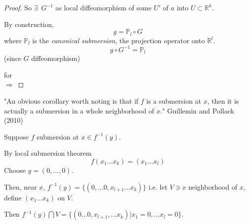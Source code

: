 \begin{proof}
So $\exists \, $ $G^{-1}$ as local diffeomorphism of some $U'$ of $a$ into $U\subset \mathbb{R}^k$.  

By construction, 
\begin{equation}
g=\mathbb{P}_l \circ G
\end{equation}
where $\mathbb{P}_l$ is the \emph{canonical submersion}, the projection operator onto $\mathbb{R}^l$.  
\[
g\circ G^{-1} = \mathbb{P}_l
\]
(since $G$ diffeomorphism)

for \\
$\Longrightarrow $ 


	\end{proof}
"An obvious corollary worth noting is that if $f$ is a submersion at $x$, then it is actually a submersion in a whole neighborhood of $x$." Guillemin and Pollack (2010) \cite{dgdt:VGuilleminAPollack2010}

Suppose $f$ submersion at $x\in f^{-1}(y)$.  

By local submersion theorem
\[
f(x_1\dots x_k)=(x_1 \dots x_l)
\]
Choose $y=(0, \dots , 0)$. 

Then, near $x$, $f^{-1}(y) = \lbrace (0, \dots 0 , x_{l+1} \dots x_k)\rbrace$ i.e. let $V\ni x$ neighborhood of $x$, define $(x_1 \dots x_k)$ on $V$.  

Then $f^{-1}(y) \bigcap V = \lbrace (0\dots 0 , x_{l+1} , \dots x_k) | x_1 = 0 , \dots x_l = 0\rbrace$.

